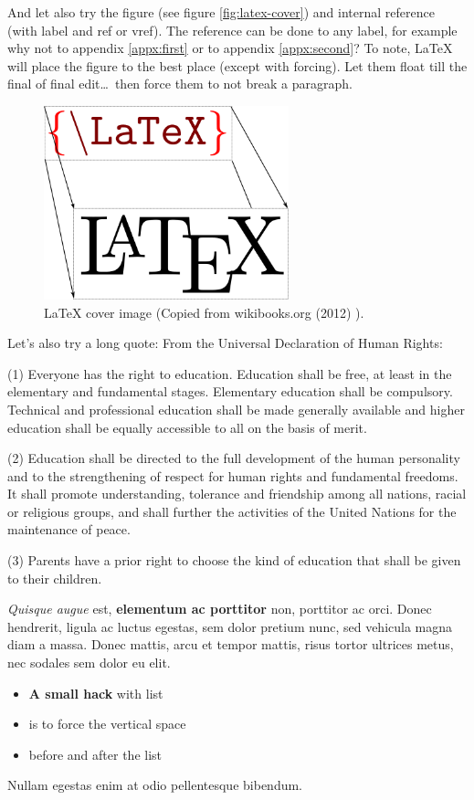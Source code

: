 \documentclass[11pt,a4paper,oneside,article]{memoir}
\renewenvironment{quote}
  {\list{}{\rightmargin=0pt\leftmargin=1cm\topsep=-10pt}%
  \item\relax\fontsize{10pt}{10pt}\singlespacing}
  {\endlist}
\begin{document}
And let also try the figure (see figure \vref{fig:latex-cover}) and internal reference (with label and ref or vref). The reference can be done to any label, for example why not to appendix \ref{appx:first} or to appendix \ref{appx:second}? To note, \LaTeX{} will place the figure to the best place (except with forcing). Let them float till the final of final edit\ldots ~then force them to not break a paragraph.%
\begin{figure}[h]
  \centering
  \includegraphics[width=7.1cm]{LaTeX_cover}
  \caption{\LaTeX{} cover image (Copied from wikibooks.org (2012) \cite{wikibooks:latex}).}
  \label{fig:latex-cover}
\end{figure}

Let's also try a long quote:
From the Universal Declaration of Human Rights:
\begin{quote}
(1) Everyone has the right to education. Education shall be free, at least in the elementary and fundamental stages. Elementary education shall be compulsory. Technical and professional education shall be made generally available and higher education shall be equally accessible to all on the basis of merit.

(2) Education shall be directed to the full development of the human personality and to the strengthening of respect for human rights and fundamental freedoms. It shall promote understanding, tolerance and friendship among all nations, racial or religious groups, and shall further the activities of the United Nations for the maintenance of peace.

(3) Parents have a prior right to choose the kind of education that shall be given to their children. \cite[article 26]{un:udhr}
\end{quote}

\textit{Quisque augue} est, \textbf{elementum ac porttitor} non, porttitor ac orci. Donec hendrerit, ligula ac luctus egestas, sem dolor pretium nunc, sed vehicula magna diam a massa. Donec mattis, arcu et tempor mattis, risus tortor ultrices metus, nec sodales sem dolor eu elit.\vspace{-17pt} 
\begin{itemize}
\item \textbf{A small hack} with list
\item is to force the vertical space 
\item before and after the list
\end{itemize}
\vspace{-17pt} Nullam egestas enim at odio pellentesque bibendum. 
\end{document}
